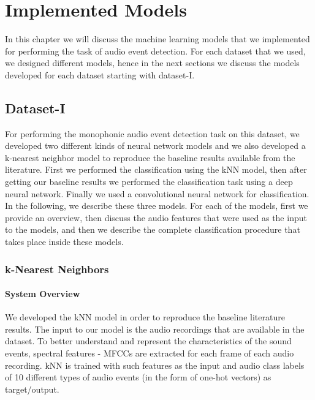 \chapter{Implemented Models}
In this chapter we will discuss the machine learning models that we implemented for performing the task of audio event detection. For each dataset that we used, we designed different models, hence in the next sections we discuss the models developed for each dataset starting with dataset-I.

\section{Dataset-I}

For performing the monophonic audio event detection task on this dataset, we developed two different kinds of neural network models and we also developed a k-nearest neighbor model to reproduce the baseline results available from the literature. First we performed the classification using the kNN model, then after getting our baseline results we performed the classification task using a deep neural network. Finally we used a convolutional neural network for classification. In the following, we describe these three models. For each of the models, first we provide an overview, then discuss the audio features that were used as the input to the models, and then we describe the complete classification procedure that takes place inside these models.

\subsection{k-Nearest Neighbors}

\subsubsection{System Overview}
We developed the kNN model in order to reproduce the baseline literature results. The input to our model is the audio recordings that are available in the dataset. To better understand and represent the characteristics of the sound events, spectral features - MFCCs are extracted for each frame of each audio recording. kNN is trained with such features as the input and audio class labels of 10 different types of audio events (in the form of one-hot vectors) as target/output. 

